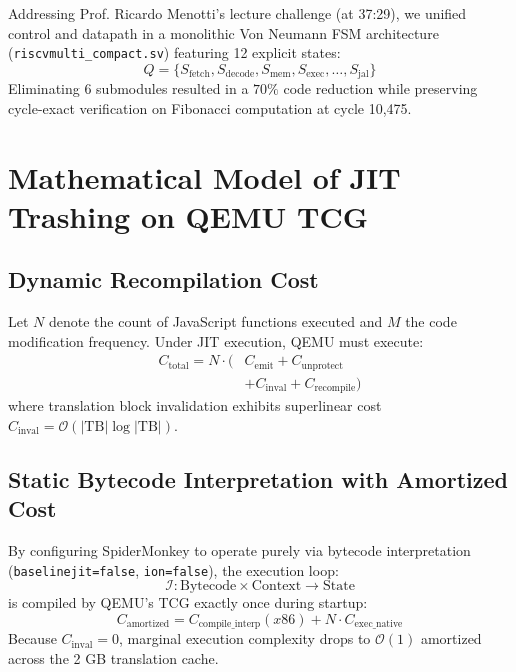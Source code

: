 \documentclass[10pt,twocolumn]{article}
\begin{document}
Addressing Prof. Ricardo Menotti's lecture challenge (at 37:29), we unified control and datapath in a monolithic Von Neumann FSM architecture (\texttt{riscvmulti\_compact.sv}) featuring 12 explicit states:
\begin{equation}
Q = \{S_{\text{fetch}}, S_{\text{decode}}, S_{\text{mem}}, S_{\text{exec}}, \dots, S_{\text{jal}}\}
\end{equation}
Eliminating 6 submodules resulted in a $70\%$ code reduction while preserving cycle-exact verification on Fibonacci computation at cycle 10,475.

\section{Mathematical Model of JIT Trashing on QEMU TCG}

\subsection{Dynamic Recompilation Cost}
Let $N$ denote the count of JavaScript functions executed and $M$ the code modification frequency. Under JIT execution, QEMU must execute:
\begin{equation}
\begin{aligned}
C_{\text{total}} = N \cdot ( & C_{\text{emit}} + C_{\text{unprotect}} \\
& + C_{\text{inval}} + C_{\text{recompile}} )
\end{aligned}
\end{equation}
where translation block invalidation exhibits superlinear cost $C_{\text{inval}} = \mathcal{O}(|\text{TB}| \log |\text{TB}|)$.

\subsection{Static Bytecode Interpretation with Amortized Cost}
By configuring SpiderMonkey to operate purely via bytecode interpretation (\texttt{baselinejit=false}, \texttt{ion=false}), the execution loop:
\begin{equation}
\mathcal{I}: \text{Bytecode} \times \text{Context} \to \text{State}
\end{equation}
is compiled by QEMU's TCG exactly once during startup:
\begin{equation}
C_{\text{amortized}} = C_{\text{compile\_interp}}(x86) + N \cdot C_{\text{exec\_native}}
\end{equation}
Because $C_{\text{inval}} = 0$, marginal execution complexity drops to $\mathcal{O}(1)$ amortized across the 2 GB translation cache.
\end{document}
